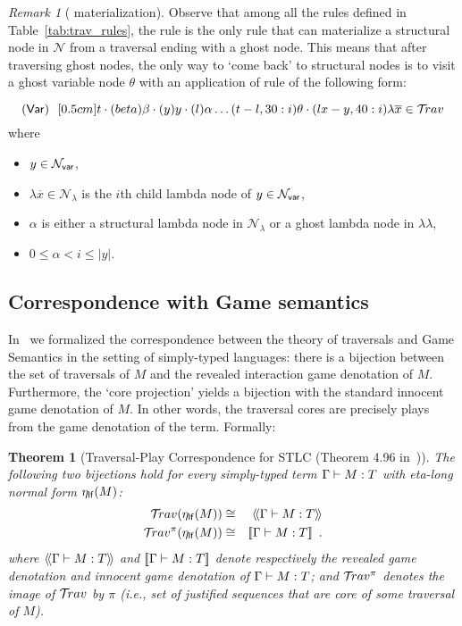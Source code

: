 \documentclass{article}
\makeatletter
\theoremstyle{plain}
\newtheorem{theorem}{Theorem}[section]
\theoremstyle{definition}
\theoremstyle{remark}
\newtheorem{remark}{Remark}[section]
\newcommand\Nodes{\mathcal{N}}%
\newcommand\NodesVar{\Nodes_{\sf var}}%
\newcommand\NodesLmd{\Nodes_\lambda}%
\newcommand{\ghostlmd}{{\lambda\!\!\lambda}}
\newcommand{\ghostvar}{\theta}
\newcommand{\travulc}{\travset}
\def\coresymbol{\pi} %
\renewcommand\ie{{\it i.e.\@\xspace}}
\makeatother
\begin{document}
\begin{remark}[ materialization]
Observe that among all the rules defined in Table~\ref{tab:trav_rules}, the rule  is the only rule that can materialize a structural node in $\Nodes$ from a traversal ending with a ghost node. This means that after traversing ghost nodes, the only way to `come back' to structural nodes is to visit a ghost variable node $\ghostvar$ with an application of rule  of the following form:

$$\rulename{Var}\ \  \Pstr[0.5cm]{ t \cdot(beta){\beta} \cdot
(y){y} \cdot (l){\alpha}  \ldots (t-l,30:i){\ghostvar}
    \cdot (lx-y,40:i){\lambda \overline{x}}
     \in\travulc}$$
where
\begin{itemize}
\item $y \in \NodesVar$,
\item $\lambda \overline{x} \in \NodesLmd$ is the $i$th child lambda node of $y \in \NodesVar$,
\item $\alpha$ is either a structural lambda node in $\Nodes_\lambda$ or a ghost lambda node in $\ghostlmd$,
\item $0\leq \alpha < i \leq |y|$.
\end{itemize}
\end{remark}

\subsection{Correspondence with Game semantics}
\label{sec:traversal_correspondence_stlc}

In~\cite{BlumPhd} we formalized the correspondence between the theory of traversals and Game Semantics in the setting of simply-typed languages: there is a bijection between the set of traversals of $M$ and the revealed interaction game denotation of $M$. Furthermore, the `core projection' yields a bijection with the standard innocent game denotation of $M$.
In other words, the traversal cores are precisely plays from the game denotation of the term.
Formally:
\begin{theorem}[Traversal-Play Correspondence for STLC (Theorem 4.96 in~\cite{BlumPhd})]
\label{thm:gamesem_correspondence_stlc}
The following two bijections hold for every simply-typed term $\Gamma \vdash M :T$ with eta-long normal form $\eta_{\sf lf}(M)$:
\begin{eqnarray*}
 \travulc(\etalf{M}) & \cong & \revsem{\Gamma \entail M :T} \\
 \travulc^\coresymbol(\etalf{M}) & \cong & \sem{\Gamma \entail M :T} \enspace .
\end{eqnarray*}
where ${\langle\!\langle \Gamma \vdash M : T \rangle\!\rangle}$ and
${[\![ \Gamma \vdash M : T ]\!]}$
denote respectively the \emph{revealed game denotation} and \emph{innocent game denotation} of
$\Gamma \vdash M : T$;
and $\travulc^\coresymbol$ denotes the image of $\travulc$ by $\coresymbol$ (\ie, set of justified sequences that are \emph{core} of some traversal of $M$).
\end{theorem}
\end{document}
